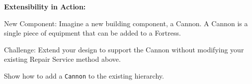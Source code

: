 {\bf Extensibility in Action:}

New Component: Imagine a new building component, a Cannon. A Cannon is a single piece of equipment that can be added to a Fortress. 

Challenge: Extend your design to support the Cannon without modifying your existing Repair Service method above.


Show how to add a  {\tt Cannon} to the existing hierarchy.


\clearpage
